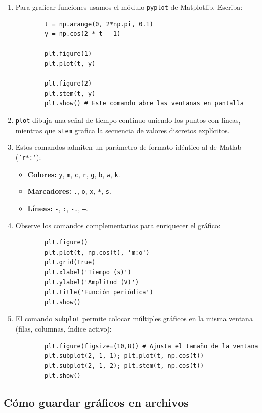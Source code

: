 \documentclass[11pt,a4paper,openany]{book}
\begin{document}
\begin{enumerate}
	\item Para graficar funciones usamos el módulo \texttt{pyplot} de Matplotlib. Escriba:
	\begin{verbatim}
		t = np.arange(0, 2*np.pi, 0.1)
		y = np.cos(2 * t - 1)
		
		plt.figure(1)
		plt.plot(t, y)
		
		plt.figure(2)
		plt.stem(t, y)
		plt.show() # Este comando abre las ventanas en pantalla
	\end{verbatim}
	
	\item \texttt{plot} dibuja una señal de tiempo continuo uniendo los puntos con líneas, mientras que \texttt{stem} grafica la secuencia de valores discretos explícitos.
	
	\item Estos comandos admiten un parámetro de formato idéntico al de Matlab (\texttt{'r*:'}):
	\begin{itemize}
		\item \textbf{Colores:} \texttt{y}, \texttt{m}, \texttt{c}, \texttt{r}, \texttt{g}, \texttt{b}, \texttt{w}, \texttt{k}.
		\item \textbf{Marcadores:} \texttt{.}, \texttt{o}, \texttt{x}, \texttt{*}, \texttt{s}.
		\item \textbf{Líneas:} \texttt{-}, \texttt{:}, \texttt{-.}, \texttt{--}.
	\end{itemize}
	
	\item Observe los comandos complementarios para enriquecer el gráfico:
	\begin{verbatim}
		plt.figure()
		plt.plot(t, np.cos(t), 'm:o')
		plt.grid(True)
		plt.xlabel('Tiempo (s)')
		plt.ylabel('Amplitud (V)')
		plt.title('Función periódica')
		plt.show()
	\end{verbatim}
	
	\item El comando \texttt{subplot} permite colocar múltiples gráficos en la misma ventana (filas, columnas, índice activo):
	\begin{verbatim}
		plt.figure(figsize=(10,8)) # Ajusta el tamaño de la ventana
		plt.subplot(2, 1, 1); plt.plot(t, np.cos(t))
		plt.subplot(2, 1, 2); plt.stem(t, np.cos(t))
		plt.show()
	\end{verbatim}
\end{enumerate}

\subsection{Cómo guardar gráficos en archivos}
\end{document}
